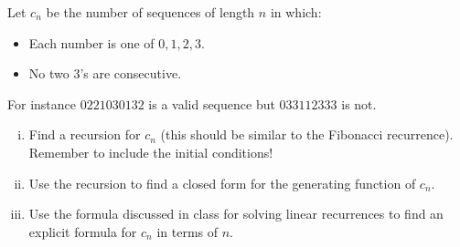 \documentclass[12pt]{memoir}
\begin{document}
\begin{Ej}[Exercise 3]
   Let $c_n$ be the number of sequences of length $n$ in which:
   \begin{itemize}
    \itemsep=-0.4em
    \item Each number is one of $0,1,2,3$.
    \item No two $3$'s are consecutive.
   \end{itemize}
   For instance $0221030132$ is a valid sequence but $033112333$ is not.
   \begin{enumerate}[i)]
    \itemsep=-0.4em 
    \item Find a recursion for $c_n$ (this should be similar to the Fibonacci recurrence). Remember to include the initial conditions!
    \item Use the recursion to find a closed form for the generating function of $c_n$.
    \item Use the formula discussed in class for solving linear recurrences to find an explicit formula for $c_n$ in terms of $n$.
   \end{enumerate}
\end{Ej}

\begin{ptcbr}

\end{ptcbr}
\end{document}
